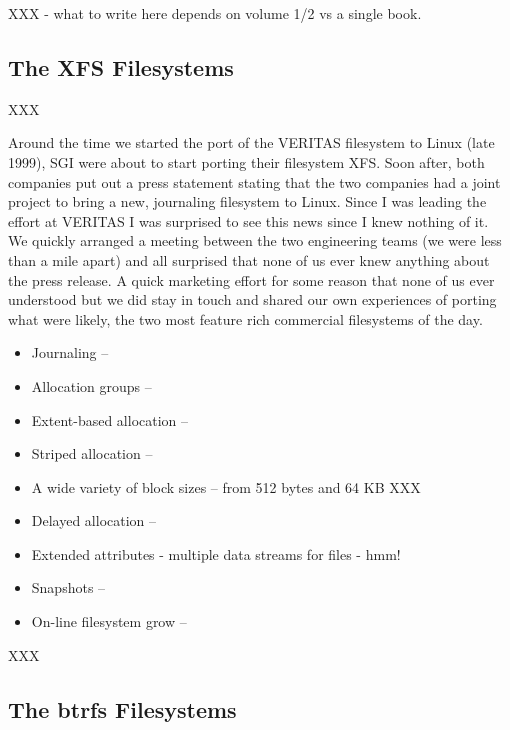 \noindent
XXX - what to write here depends on volume 1/2 vs a single book.


\subsection{The XFS Filesystems}

XXX

Around the time we started the port of the VERITAS filesystem to Linux (late 1999), SGI were about to start porting their filesystem XFS. Soon after, both companies put out a press statement stating that the two companies had a joint project to bring a new, journaling filesystem to Linux. Since I was leading the effort at VERITAS I was surprised to see this news since I knew nothing of it. We quickly arranged a meeting between the two engineering teams (we were less than a mile apart) and all surprised that none of us ever knew anything about the press release. A quick marketing effort for some reason that none of us ever understood but we did stay in touch and shared our own experiences of porting what were likely, the two most feature rich commercial filesystems of the day.

\begin{itemize}
	\item Journaling -- 
	\item Allocation groups -- 
	\item Extent-based allocation -- 
	\item Striped allocation -- 
	\item A wide variety of block sizes -- from 512 bytes and 64 KB XXX
	\item Delayed allocation -- 
	\item Extended attributes - multiple data streams for files - hmm!
	\item Snapshots -- 
	\item On-line filesystem grow -- 
\end{itemize}

\noindent
XXX


\subsection{The btrfs Filesystems}

